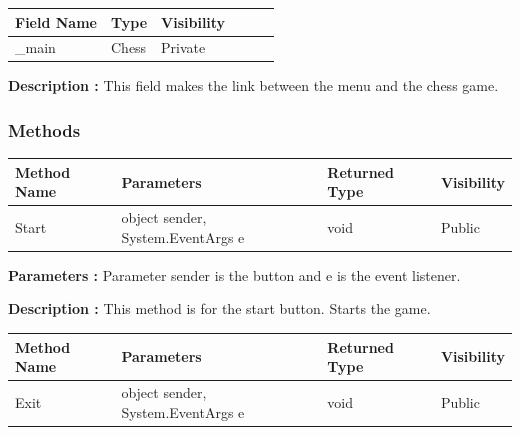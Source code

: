 \documentclass[12pt]{article}
\begin{document}
    \begin{table}[H]
        \begin{tabular}{llllll}
            \hline
            \multicolumn{1}{|l|}{\cellcolor[HTML]{EFEFEF}\textbf{Field Name}} & \multicolumn{1}{l|}{\cellcolor[HTML]{EFEFEF}\textbf{Type}} & \multicolumn{1}{l|}{\cellcolor[HTML]{EFEFEF}\textbf{Visibility}} \\ \hline
            \multicolumn{1}{|l|}{\_main}                                      & \multicolumn{1}{l|}{Chess}                                 & \multicolumn{1}{l|}{Private}                                     \\ \hline
        \end{tabular}
    \end{table}

    \textbf{Description :} This field makes the link between the menu and the chess game.

    \subsubsection{Methods}

    \begin{table}[H]
        \begin{tabular}{|l|l|l|l|}
            \hline
            \rowcolor[HTML]{EFEFEF}
            \cellcolor[HTML]{EFEFEF}\textbf{Method Name} & \textbf{Parameters}               & \textbf{Returned Type} & \textbf{Visibility} \\ \hline
            Start                                        & object sender, System.EventArgs e & void                   & Public              \\ \hline
        \end{tabular}
    \end{table}

    \textbf{Parameters :} Parameter sender is the button and e is the event listener.

    \textbf{Description :} This method is for the start button. Starts the game.

    \begin{table}[H]
        \begin{tabular}{|l|l|l|l|}
            \hline
            \rowcolor[HTML]{EFEFEF}
            \cellcolor[HTML]{EFEFEF}\textbf{Method Name} & \textbf{Parameters}               & \textbf{Returned Type} & \textbf{Visibility} \\ \hline
            Exit                                         & object sender, System.EventArgs e & void                   & Public              \\ \hline
        \end{tabular}
    \end{table}
\end{document}
